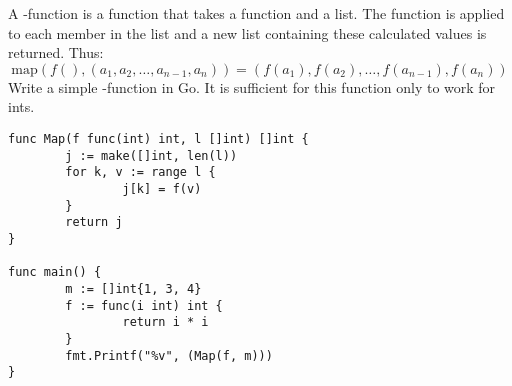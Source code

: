 \begin{Exercise}[title={Map function},difficulty=1]
\label{ex:map function}
A -function is a function that takes
a function and a list. The function is applied to 
each member in the list and a new list containing
these calculated values is returned.
Thus: 
$$ \mathrm{map}(f(), (a_1,a_2,\ldots,a_{n-1},a_n)) =  (f(a_1), f(a_2),\ldots,f(a_{n-1}), f(a_n)) $$
\Question \label{ex:map function q1} Write a simple
-function in Go. It is sufficient
for this function only to work for ints.

\end{Exercise}

\begin{Answer}

\Question 
\begin{lstlisting}[]
func Map(f func(int) int, l []int) []int {
        j := make([]int, len(l))
        for k, v := range l {
                j[k] = f(v)
        }
        return j
}

func main() {
        m := []int{1, 3, 4}
        f := func(i int) int {
                return i * i
        }
        fmt.Printf("%v", (Map(f, m)))
}
\end{lstlisting}

\end{Answer}
